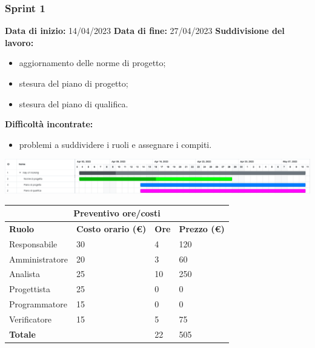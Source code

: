 \documentclass[a4paper, 12pt]{article}
\begin{document}
\subsubsection{Sprint 1}
\textbf{Data di inizio:} 14/04/2023\newline
\textbf{Data di fine:} 27/04/2023\newline
\newline
\textbf{Suddivisione del lavoro:}
\begin{itemize}
    \item aggiornamento delle norme di progetto;
    \item stesura del piano di progetto;
    \item stesura del piano di qualifica.
\end{itemize}
\textbf{Difficoltà incontrate:}
\begin{itemize}
    \item problemi a suddividere i ruoli e assegnare i compiti.
\end{itemize}
\includegraphics[scale=0.24]{WoW_1.png}\newline
\newline

\begin{center}
	\begin{tabularx}{\textwidth}{|X|X|X|X|}
		\hline
		\multicolumn{4}{|c|}{\textbf{Preventivo ore/costi}}                                      \\
		\hline
		\hline
		\textbf{Ruolo}  & \textbf{Costo orario (\euro)} & \textbf{Ore} & \textbf{Prezzo (\euro)} \\
		\hline
		Responsabile    & 30                            & 4            & 120                     \\
		\hline
		Amministratore  & 20                            & 3            & 60                      \\
		\hline
		Analista        & 25                            & 10            & 250                     \\
		\hline
		Progettista     & 25                            & 0            & 0                       \\
		\hline
		Programmatore   & 15                            & 0            & 0                       \\
		\hline
		Verificatore    & 15                            & 5            & 75                      \\
		\hline
		\hline
		\textbf{Totale} &                               & 22           & 505                     \\
		\hline
	\end{tabularx}\\[8pt]
	\mbox{}\\
\end{center}
\end{document}
